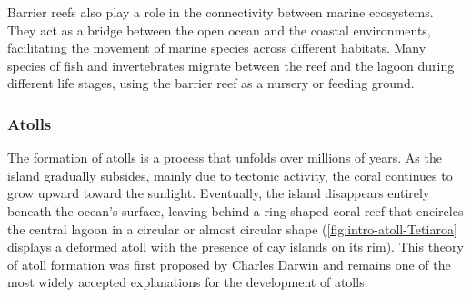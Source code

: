 Barrier reefs also play a role in the connectivity between marine ecosystems. They act as a bridge between the open ocean and the coastal environments, facilitating the movement of marine species across different habitats. Many species of fish and invertebrates migrate between the reef and the lagoon during different life stages, using the barrier reef as a nursery or feeding ground.

\subsubsection{Atolls}
The formation of atolls is a process that unfolds over millions of years. As the island gradually subsides, mainly due to tectonic activity, the coral continues to grow upward toward the sunlight. Eventually, the island disappears entirely beneath the ocean's surface, leaving behind a ring-shaped coral reef that encircles the central lagoon in a circular or almost circular shape (\cref{fig:intro-atoll-Tetiaroa} displays a deformed atoll with the presence of cay islands on its rim). This theory of atoll formation was first proposed by Charles Darwin and remains one of the most widely accepted explanations for the development of atolls.






